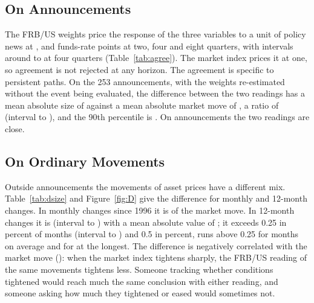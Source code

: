 \documentclass[11pt]{article}
\begin{document}
\subsection{On Announcements}\label{sec:onannounce}
The FRB/US weights price the response of the three variables to a unit of policy news at ,  and  funds-rate points at two, four and eight quarters, with intervals around  to  at four quarters (Table~\ref{tab:agree}). The market index prices it at one, so agreement is not rejected at any horizon. The agreement is specific to persistent paths. On the 253 announcements, with the weights re-estimated without the event being evaluated, the difference between the two readings has a mean absolute size of  against a mean absolute market move of , a ratio of  (interval  to ), and the 90th percentile is . On announcements the two readings are close.



\subsection{On Ordinary Movements}\label{sec:ordinary}
Outside announcements the movements of asset prices have a different mix. Table~\ref{tab:dsize} and Figure~\ref{fig:D} give the difference for monthly and 12-month changes. In monthly changes since 1996 it is  of the market move. In 12-month changes it is  (interval  to ) with a mean absolute value of ; it exceeds 0.25 in  percent of months (interval  to ) and 0.5 in  percent, runs above 0.25 for  months on average and for  at the longest. The difference is negatively correlated with the market move (): when the market index tightens sharply, the FRB/US reading of the same movements tightens less. Someone tracking whether conditions tightened would reach much the same conclusion with either reading, and someone asking how much they tightened or eased would sometimes not.


\end{document}

